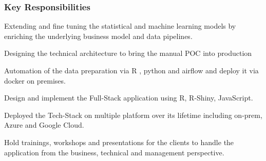 \documentclass[letter,10pt]{article}
\begin{document}
\subsubsection*{{Key Responsibilities}}
\begin{zitemize} 
	\item Extending and fine tuning the statistical and machine learning models by enriching the underlying business model and data pipelines. 
	\item Designing the technical architecture to bring the manual POC into production 
	\item Automation of the data preparation via R , python and airflow and deploy it via docker on premises. 
	\item Design and implement the Full-Stack application using R, R-Shiny, JavaScript.     
	\item Deployed the Tech-Stack on multiple platform over its lifetime including on-prem, Azure and Google Cloud.
	\item Hold trainings, workshops and presentations for the clients to handle the application from the business, technical and management perspective. 

\end{zitemize}
\end{document}
